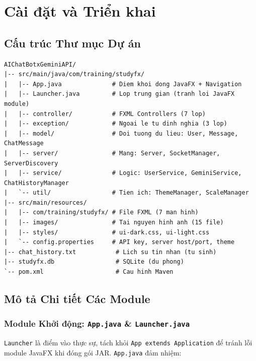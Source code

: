 \documentclass[12pt, a4paper, oneside]{report}
\newcommand{\code}[1]{\texttt{\color{hustblue!80!black}#1}}
\begin{document}
\chapter{Cài đặt và Triển khai}

\section{Cấu trúc Thư mục Dự án}

\begin{tcolorbox}[codestyle]
\begin{lstlisting}[style=bashstyle, numbers=none]
AIChatBotxGeminiAPI/
|-- src/main/java/com/training/studyfx/
|   |-- App.java              # Diem khoi dong JavaFX + Navigation
|   |-- Launcher.java         # Lop trung gian (tranh loi JavaFX module)
|   |-- controller/           # FXML Controllers (7 lop)
|   |-- exception/            # Ngoai le tu dinh nghia (3 lop)
|   |-- model/                # Doi tuong du lieu: User, Message, ChatMessage
|   |-- server/               # Mang: Server, SocketManager, ServerDiscovery
|   |-- service/              # Logic: UserService, GeminiService, ChatHistoryManager
|   `-- util/                 # Tien ich: ThemeManager, ScaleManager
|-- src/main/resources/
|   |-- com/training/studyfx/ # File FXML (7 man hinh)
|   |-- images/               # Tai nguyen hinh anh (15 file)
|   |-- styles/               # ui-dark.css, ui-light.css
|   `-- config.properties     # API key, server host/port, theme
|-- chat_history.txt           # Lich su tin nhan (tu sinh)
|-- studyfx.db                 # SQLite (du phong)
`-- pom.xml                    # Cau hinh Maven
\end{lstlisting}
\end{tcolorbox}

\section{Mô tả Chi tiết Các Module}

\subsection{Module Khởi động: \texttt{App.java} \& \texttt{Launcher.java}}

\code{Launcher} là điểm vào thực sự, tách khỏi \code{App extends Application}
để tránh lỗi module JavaFX khi đóng gói JAR. \code{App.java} đảm nhiệm:
\end{document}

